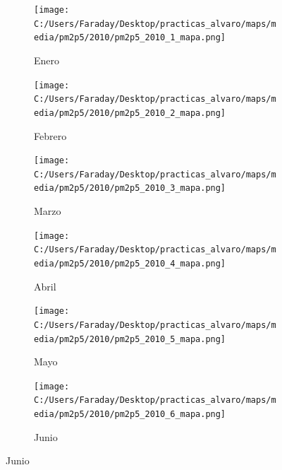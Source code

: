 \documentclass[12pt]{article}
\begin{document}
\begin{figure}[H]
\centering
\begin{subfigure}[H]{0.15\textwidth}
\texttt{[image: C:/Users/Faraday/Desktop/practicas\_alvaro/maps/media/pm2p5/2010/pm2p5\_2010\_1\_mapa.png]}
\captionsetup{labelformat=empty}
\caption{Enero}
\label{fig:map-pm2p5-2010-1}
\end{subfigure}
%
\begin{subfigure}[H]{0.15\textwidth}
\texttt{[image: C:/Users/Faraday/Desktop/practicas\_alvaro/maps/media/pm2p5/2010/pm2p5\_2010\_2\_mapa.png]}
\captionsetup{labelformat=empty}
\caption{Febrero}
\label{fig:map-pm2p5-2010-2}
\end{subfigure}
%
\begin{subfigure}[H]{0.15\textwidth}
\texttt{[image: C:/Users/Faraday/Desktop/practicas\_alvaro/maps/media/pm2p5/2010/pm2p5\_2010\_3\_mapa.png]}
\captionsetup{labelformat=empty}
\caption{Marzo}
\label{fig:map-pm2p5-2010-3}
\end{subfigure}
%
\begin{subfigure}[H]{0.15\textwidth}
\texttt{[image: C:/Users/Faraday/Desktop/practicas\_alvaro/maps/media/pm2p5/2010/pm2p5\_2010\_4\_mapa.png]}
\captionsetup{labelformat=empty}
\caption{Abril}
\label{fig:map-pm2p5-2010-4}
\end{subfigure}
%
\begin{subfigure}[H]{0.15\textwidth}
\texttt{[image: C:/Users/Faraday/Desktop/practicas\_alvaro/maps/media/pm2p5/2010/pm2p5\_2010\_5\_mapa.png]}
\captionsetup{labelformat=empty}
\caption{Mayo}
\label{fig:map-pm2p5-2010-5}
\end{subfigure}
%
\begin{subfigure}[H]{0.15\textwidth}
\texttt{[image: C:/Users/Faraday/Desktop/practicas\_alvaro/maps/media/pm2p5/2010/pm2p5\_2010\_6\_mapa.png]}
\captionsetup{labelformat=empty}
\caption{Junio}
\label{fig:map-pm2p5-2010-6}
\end{subfigure}


\end{figure}
\end{document}
